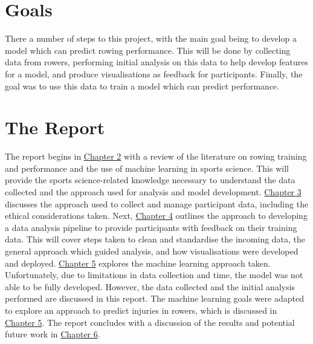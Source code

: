 
\section{Goals}
There a number of steps to this project, with the main goal being to develop a model which can predict rowing performance. This will be done by collecting data from rowers, performing initial analysis on this data to help develop features for a model, and produce visualisations as feedback for participants. Finally, the goal was to use this data to train a model which can predict performance. 

\section{The Report}
The report begins in \hyperref[ch:background]{Chapter 2} with a review of the literature on rowing training and performance and the use of machine learning in sports science. This will provide the sports science-related knowledge necessary to understand the data collected and the approach used for analysis and model development. \hyperref[ch:data-collect-mng]{Chapter 3} discusses the approach used to collect and manage participant data, including the ethical considerations taken. Next, \hyperref[ch:data-anyl-viz]{Chapter 4} outlines the approach to developing a data analysis pipeline to provide participants with feedback on their training data. This will cover steps taken to clean and standardise the incoming data, the general approach which guided analysis, and how visualisations were developed and deployed. \hyperref[ch:ml]{Chapter 5} explores the machine learning approach taken. Unfortunately, due to limitations in data collection and time, the model was not able to be fully developed. However, the data collected and the initial analysis performed are discussed in this report. The machine learning goals were adapted to explore an approach to predict injuries in rowers, which is discussed in \hyperref[ch:ml]{Chapter 5}. The report concludes with a discussion of the results and potential future work in \hyperref[ch:discussion]{Chapter 6}.
